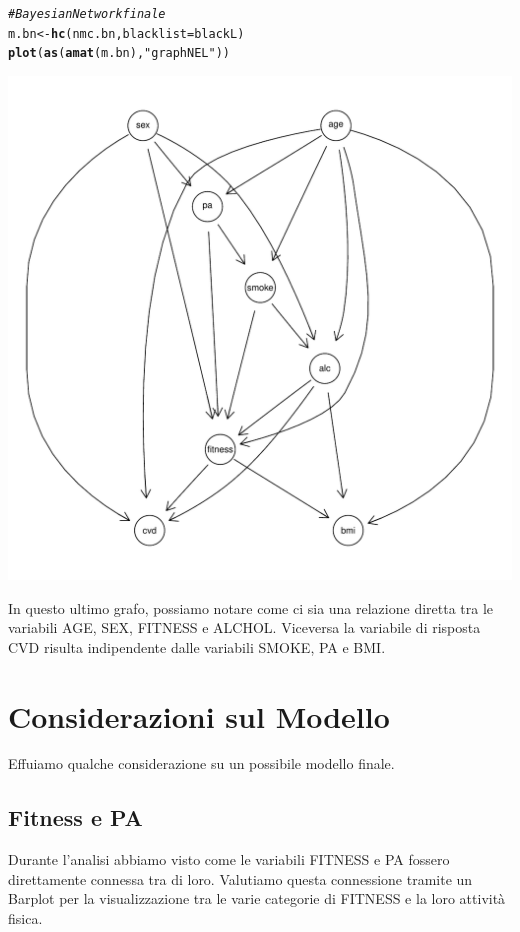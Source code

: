 \documentclass{article}\usepackage[]{graphicx}\usepackage[]{xcolor}
\makeatletter
\def\maxwidth{ %
  \ifdim\Gin@nat@width>\linewidth
    \linewidth
  \else
    \Gin@nat@width
  \fi
}
\newcommand{\hlstr}[1]{\textcolor[rgb]{0.192,0.494,0.8}{#1}}%
\newcommand{\hlcom}[1]{\textcolor[rgb]{0.678,0.584,0.686}{\textit{#1}}}%
\newcommand{\hlstd}[1]{\textcolor[rgb]{0.345,0.345,0.345}{#1}}%
\newcommand{\hlkwb}[1]{\textcolor[rgb]{0.69,0.353,0.396}{#1}}%
\newcommand{\hlkwc}[1]{\textcolor[rgb]{0.333,0.667,0.333}{#1}}%
\newcommand{\hlkwd}[1]{\textcolor[rgb]{0.737,0.353,0.396}{\textbf{#1}}}%
\newenvironment{kframe}{%
 \def\at@end@of@kframe{}%
 \ifinner\ifhmode%
  \def\at@end@of@kframe{\end{minipage}}%
  \begin{minipage}{\columnwidth}%
 \fi\fi%
 \def\FrameCommand##1{\hskip\@totalleftmargin \hskip-\fboxsep
 \colorbox{shadecolor}{##1}\hskip-\fboxsep
     \hskip-\linewidth \hskip-\@totalleftmargin \hskip\columnwidth}%
 \MakeFramed {\advance\hsize-\width
   \@totalleftmargin\z@ \linewidth\hsize
   \@setminipage}}%
 {\par\unskip\endMakeFramed%
 \at@end@of@kframe}
\newenvironment{knitrout}{}{} %
\makeatother
\begin{document}
\begin{knitrout}
\color{fgcolor}\begin{kframe}
\begin{alltt}
\hlcom{#Bayesian Network finale}
\hlstd{m.bn} \hlkwb{<-} \hlkwd{hc}\hlstd{(nmc.bn,} \hlkwc{blacklist}\hlstd{=blackL)}
\hlkwd{plot}\hlstd{(}\hlkwd{as}\hlstd{(}\hlkwd{amat}\hlstd{(m.bn),} \hlstr{"graphNEL"}\hlstd{))}
\end{alltt}
\end{kframe}
\includegraphics[width=\maxwidth]{figure/Bayesian_Network_finale-1} 
\end{knitrout}
      
      In questo ultimo grafo, possiamo notare come ci sia una relazione diretta
      tra le variabili AGE, SEX, FITNESS e ALCHOL. Viceversa la variabile di 
      risposta CVD risulta indipendente dalle variabili SMOKE, PA e BMI.
    
  \clearpage


\section{Considerazioni sul Modello}
  Effuiamo qualche considerazione su un possibile modello finale.
  
  \subsection{Fitness e PA}
    Durante l'analisi abbiamo visto come le variabili FITNESS e PA fossero 
    direttamente connessa tra di loro. Valutiamo questa connessione tramite
    un Barplot per la visualizzazione tra le varie categorie di FITNESS e la 
    loro attività fisica.
    
\end{document}
